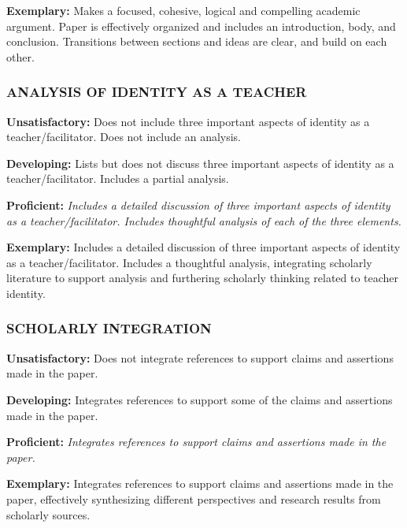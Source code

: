 \documentclass[
]{book}
\begin{document}
\textbf{Exemplary:} Makes a focused, cohesive, logical and compelling academic argument. Paper is effectively organized and includes an introduction, body, and conclusion. Transitions between sections and ideas are clear, and build on each other.

\hypertarget{analysis-of-identity-as-a-teacher}{%
\subsubsection*{ANALYSIS OF IDENTITY AS A TEACHER}\label{analysis-of-identity-as-a-teacher}}

\textbf{Unsatisfactory:} Does not include three important aspects of identity as a teacher/facilitator. Does not include an analysis.

\textbf{Developing:} Lists but does not discuss three important aspects of identity as a teacher/facilitator. Includes a partial analysis.

\textbf{Proficient:} \emph{Includes a detailed discussion of three important aspects of identity as a teacher/facilitator. Includes thoughtful analysis of each of the three elements.}

\textbf{Exemplary:} Includes a detailed discussion of three important aspects of identity as a teacher/facilitator. Includes a thoughtful analysis, integrating scholarly literature to support analysis and furthering scholarly thinking related to teacher identity.

\hypertarget{scholarly-integration}{%
\subsubsection*{SCHOLARLY INTEGRATION}\label{scholarly-integration}}

\textbf{Unsatisfactory:} Does not integrate references to support claims and assertions made in the paper.

\textbf{Developing:} Integrates references to support some of the claims and assertions made in the paper.

\textbf{Proficient:} \emph{Integrates references to support claims and assertions made in the paper.}

\textbf{Exemplary:} Integrates references to support claims and assertions made in the paper, effectively synthesizing different perspectives and research results from scholarly sources.
\end{document}
